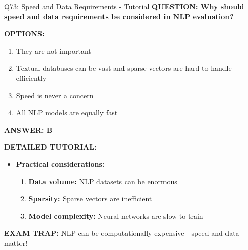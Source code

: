 \documentclass[8pt]{beamer}
\begin{document}
	\begin{frame}{Q73: Speed and Data Requirements - Tutorial}
		\fontsize{6.5}{7.5}\selectfont
		\textbf{QUESTION: Why should speed and data requirements be considered in NLP evaluation?}
		
		\vspace{0.1cm}
		\textbf{OPTIONS:}
		\begin{enumerate}
			\item They are not important
			\item Textual databases can be vast and sparse vectors are hard to handle efficiently
			\item Speed is never a concern
			\item All NLP models are equally fast
		\end{enumerate}
		
		\vspace{0.1cm}
		\textcolor{myblue}{\textbf{ANSWER: B}}
		
		\vspace{0.1cm}
		\textbf{DETAILED TUTORIAL:}
		\begin{itemize}
			\item \textbf{Practical considerations:}
			\begin{enumerate}
				\item \textbf{Data volume:} NLP datasets can be enormous
				\item \textbf{Sparsity:} Sparse vectors are inefficient
				\item \textbf{Model complexity:} Neural networks are slow to train
			\end{enumerate}
		\end{itemize}
		
		\textcolor{myred}{\textbf{EXAM TRAP:}} NLP can be \textcolor{myblue}{computationally expensive} - speed and data matter!
	\end{frame}
	
\end{document}
